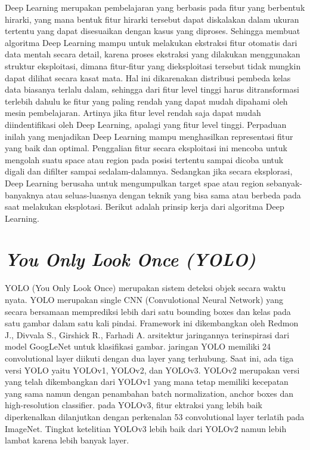 Deep Learning merupakan pembelajaran yang berbasis pada
fitur yang berbentuk hirarki, yang mana bentuk fitur hirarki tersebut
dapat diskalakan dalam ukuran tertentu yang dapat disesuaikan
dengan kasus yang diproses. Sehingga membuat algoritma Deep
Learning mampu untuk melakukan ekstraksi fitur otomatis dari data
mentah secara detail, karena proses ekstraksi yang dilakukan
menggunakan struktur eksploitasi, dimana fitur-fitur yang
dieksploitasi tersebut tidak mungkin dapat dilihat secara kasat mata.
Hal ini dikarenakan distribusi pembeda kelas data biasanya terlalu
dalam, sehingga dari fitur level tinggi harus ditransformasi terlebih
dahulu ke fitur yang paling rendah yang dapat mudah dipahami oleh
mesin pembelajaran. Artinya jika fitur level rendah saja dapat mudah
diindentifikasi oleh Deep Learning, apalagi yang fitur level tinggi.
Perpaduan inilah yang menjadikan Deep Learning mampu
menghasilkan representasi fitur yang baik dan optimal. Penggalian
fitur secara eksploitasi ini mencoba untuk mengolah suatu space atau
region pada posisi tertentu sampai dicoba untuk digali dan difilter
sampai sedalam-dalamnya. Sedangkan jika secara eksplorasi, Deep
Learning berusaha untuk mengumpulkan target spae atau region
sebanyak-banyaknya atau seluas-luasnya dengan teknik yang bisa
sama atau berbeda pada saat melakukan eksplotasi. Berikut adalah
prinsip kerja dari algoritma Deep Learning.\citep{bookDL}

\section{\textit{You Only Look Once (YOLO)}}
\label{subsec:YOLO}
YOLO (You Only Look Once) merupakan sistem deteksi objek secara waktu nyata. YOLO merupakan single CNN (Convulotional Neural Network) yang secara bersamaan memprediksi lebih dari satu bounding boxes dan kelas pada satu gambar dalam satu kali pindai. Framework ini dikembangkan oleh Redmon J., Divvala S., Girshick R., Farhadi A. arsitektur jaringannya terinspirasi dari model GoogLeNet untuk klasifikasi gambar. jaringan YOLO memiliki 24 convolutional layer diikuti dengan dua layer yang terhubung.
Saat ini, ada tiga versi YOLO yaitu YOLOv1, YOLOv2, dan YOLOv3. YOLOv2 merupakan versi yang telah dikembangkan dari YOLOv1 yang mana tetap memiliki kecepatan yang sama namun dengan penambahan batch normalization, anchor boxes dan high-resolution classifier. pada YOLOv3, fitur ektraksi yang lebih baik diperkenalkan dilanjutkan dengan perkenalan 53 convolutional layer terlatih pada ImageNet. Tingkat ketelitian YOLOv3 lebih baik dari YOLOv2 namun lebih lambat karena lebih banyak layer.\citep{Redmon_2016_CVPR}

